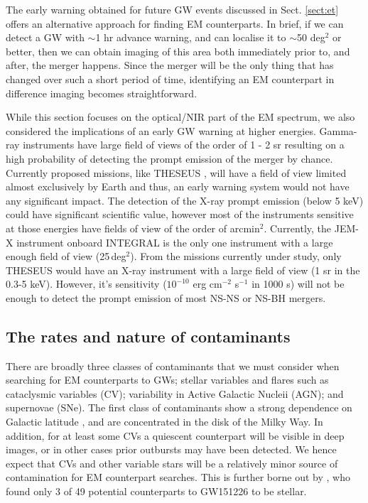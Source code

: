 \documentclass{aa}
\begin{document}
The early warning obtained for future GW events discussed in Sect. \ref{sect:et} offers an alternative approach for finding EM counterparts. In brief, if we can detect a GW with $\sim$1 hr advance warning, and can localise it to $\sim$50 deg$^2$ or better, then we can obtain imaging of this area both immediately prior to, and after, the merger happens. Since the merger will be the only thing that has changed over such a short period of time, identifying an EM counterpart in difference imaging becomes straightforward.

While this section focuses on the optical/NIR part of the EM spectrum, 
we also considered the implications of an early GW warning at higher energies. Gamma-ray instruments have large field of views of the order of 1 - 2 sr resulting on a high probability of detecting the prompt emission of the merger by chance. Currently proposed missions, like THESEUS \citep{2018AdSpR..62..191A}, will have a field of view limited almost exclusively by Earth and thus, an early warning system would not have any significant impact. The detection of the X-ray prompt emission (below 5 keV) could have significant scientific value, however most of the instruments sensitive at those energies have fields of view of the order of arcmin$^2$. Currently, the JEM-X instrument onboard INTEGRAL is the only one instrument with a large enough field of view (25\,deg$^2$). From the missions currently under study, only THESEUS would have an X-ray instrument with a large field of view (1 sr in the 0.3-5 keV). However, it’s sensitivity ($10^{-10}$ erg cm$^{-2}$ s$^{-1}$ in 1000 s) will not be enough to detect the prompt emission of most NS-NS or NS-BH mergers.

\subsection{The rates and nature of contaminants}

There are broadly three classes of contaminants that we must consider when searching for EM counterparts to GWs; stellar variables and flares such as cataclysmic variables (CV); variability in Active Galactic Nucleii (AGN); and supernovae (SNe). The first class of contaminants show a strong dependence on Galactic latitude \citep{Drak14}, and are concentrated in the disk of the Milky Way. In addition, for at least some CVs a quiescent counterpart will be visible in deep images, or in other cases prior outbursts may have been detected. We hence expect that CVs and other variable stars will be a relatively minor source of contamination for EM counterpart searches. This is further borne out by \cite{Smar16}, who found only 3 of 49 potential counterparts to GW151226 to be stellar.
\end{document}
